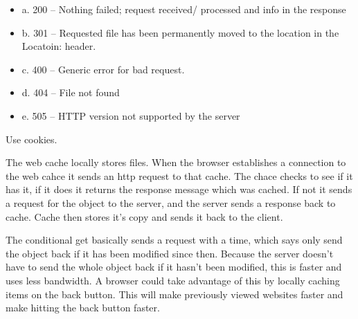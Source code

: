 \documentclass[12pt,letterpaper,boxed]{hmcpset}
\begin{document}
\begin{problem}
\end{problem}
\begin{itemize}
\item a. 200 – Nothing failed; request received/ processed and info in the response
\item b. 301 – Requested file has been permanently moved to the location in the Locatoin: header.
\item c. 400 – Generic error for bad request.
\item d. 404 – File not found
\item e. 505 – HTTP version not supported by the server


\end{itemize}


\begin{problem}
\end{problem}
Use cookies.

\begin{problem}
\end{problem}
The web cache locally stores files. When the browser establishes a connection to the web cahce it sends an http request
to that cache. The chace checks to see if it has it, if it does it returns the response message which was cached. If not it sends a request for the object to the server, and the server sends a response back to cache. Cache then stores it’s copy and sends it back to the client.

\begin{problem}
\end{problem}
The conditional get basically sends a request with a time, which says only send the object back if it has been modified since then. Because the server doesn’t have to send the whole object back if it hasn’t been modified, this is faster and uses less bandwidth. A browser could take advantage of this by locally caching items on the back button. This will make previously viewed websites faster and make hitting the back button faster.
\end{document}
